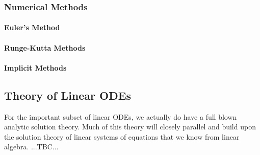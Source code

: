 

\subsubsection{Numerical Methods}

\paragraph{Euler's Method}

\paragraph{Runge-Kutta Methods}

\paragraph{Implicit Methods}




\subsection{Theory of Linear ODEs}
For the important subset of linear ODEs, we actually do have a full blown analytic solution theory. Much of this theory will closely parallel and build upon the solution theory of linear systems of equations that we know from linear algebra. ...TBC...







